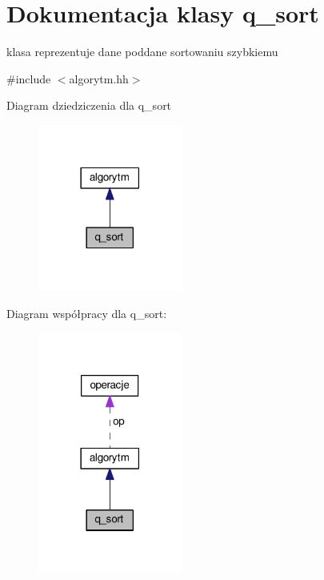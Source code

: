 \hypertarget{classq__sort}{\section{Dokumentacja klasy q\-\_\-sort}
\label{classq__sort}
}


klasa reprezentuje dane poddane sortowaniu szybkiemu  




{\ttfamily \#include $<$algorytm.\-hh$>$}



Diagram dziedziczenia dla q\-\_\-sort\nopagebreak
\begin{figure}[H]
\begin{center}
\leavevmode
\includegraphics[width=134pt]{classq__sort__inherit__graph}
\end{center}
\end{figure}


Diagram współpracy dla q\-\_\-sort\-:\nopagebreak
\begin{figure}[H]
\begin{center}
\leavevmode
\includegraphics[width=134pt]{classq__sort__coll__graph}
\end{center}
\end{figure}
